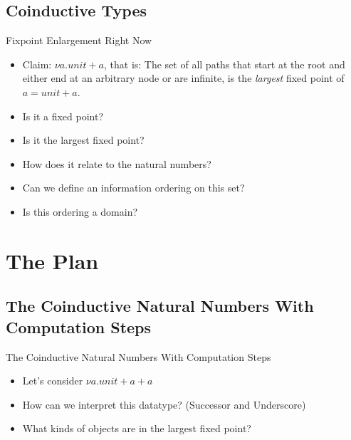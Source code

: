 \documentclass{beamer}
\begin{document}
\subsection{Coinductive Types}

\begin{frame}{Fixpoint Enlargement Right Now}

  \begin{itemize}
    \item Claim: $\nu a . unit + a$, that is: The set of all paths that start
          at the root and either end at an arbitrary node or are infinite, is
          the \emph{largest} fixed point of $a = unit + a$.
    \item Is it a fixed point?
    \item Is it the largest fixed point?
    \item How does it relate to the natural numbers?
    \item Can we define an information ordering on this set?
    \item Is this ordering a domain?
  \end{itemize}

\end{frame}


\section{The Plan}

\subsection{The Coinductive Natural Numbers With Computation Steps}

\begin{frame}{The Coinductive Natural Numbers With Computation Steps}

  \begin{itemize}
    \item
      Let's consider $\nu a . unit + a + a$
    \item
      How can we interpret this datatype? (Successor and Underscore)
    \item
      What kinds of objects are in the largest fixed point?
  \end{itemize}

  \begin{center}
  \end{center}

\end{frame}
\end{document}
